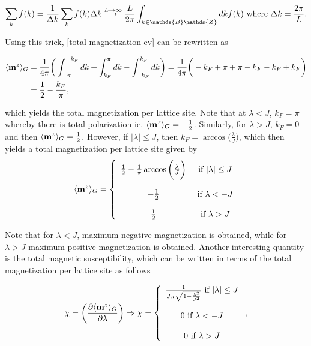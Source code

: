 \documentclass{homework}
\begin{document}
\begin{equation*}
    \sum_{k} f(k) = \frac{1}{\Delta k} \sum_{k} f(k) \Delta k \overset{L \rightarrow \infty}{\rightarrow} \frac{L}{2\pi}\int_{k \in \mathds{B}\mathds{Z}} dk f(k) \textnormal{ where } \Delta k = \frac{2\pi}{L}.
\end{equation*}

Using this trick, \eqref{total magnetization ev} can be rewritten as 

\begin{align}
    \langle {{\bf m}}^{z} \rangle_{G} &= \frac{1}{4\pi} \bigg(\int_{-\pi}^{-k_F} dk + \int_{k_F}^{\pi} dk - \int_{-k_F}^{k_F} dk \bigg) = \frac{1}{4\pi} \bigg(-k_F + \pi + \pi - k_F - k_F + k_F\bigg) \\
    &= \frac{1}{2} - \frac{k_F}{\pi},
\end{align}

which yields the total magnetization per lattice site. Note that at $\lambda < J$, $k_F = \pi$ whereby there is total polarization ie. $\langle {{\bf m}}^{z} \rangle_{G} = -\frac{1}{2}$. Similarly, for $\lambda > J$, $k_F = 0$ and then $\langle {{\bf m}}^{z} \rangle_{G} = \frac{1}{2}$. However, if $|\lambda| \leq J$, then $k_F = \arccos\bigg(\frac{\lambda}{J}\bigg)$, which then yields a total magnetization per lattice site given by 
\begin{equation} \langle {{\bf m}}^{z} \rangle_{G}  = \left\{
    \begin{array}{cc}
          \frac{1}{2} - \frac{1}{\pi}\arccos\bigg(\frac{\lambda}{J}\bigg)&  \textnormal{ if } |\lambda| \leq J  \\
          \\
          -\frac{1}{2} & \textnormal{ if } \lambda < -J  \\
          \\
          \frac{1}{2} & \textnormal{ if } \lambda > J  \\
    \end{array} \right.
\end{equation}

Note that for $\lambda < J$, maximum negative magnetization is obtained, while for $\lambda > J$ maximum positive magnetization is obtained. Another interesting quantity is the total magnetic susceptibility, which can be written in terms of the total magnetization per lattice site as follows 

\begin{align}
    \chi = \bigg(\frac{\partial \langle {{\bf m}}^{z} \rangle_{G}}{\partial \lambda}\bigg) \Rightarrow \chi = \left\{ \begin{array}{cc} 
         \frac{1}{J \pi \sqrt{1- \frac{\lambda^2}{J^2}}} \textnormal{ if } |\lambda| \leq J  \\
         \\
          0 \textnormal{ if } \lambda < -J \\ 
         \\
          0 \textnormal{ if } \lambda > J  \\
              \end{array} \right., \label{}
\end{align}
\end{document}
